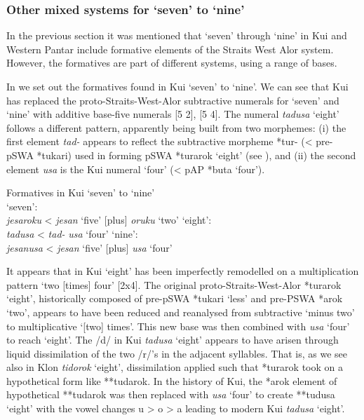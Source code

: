 \subsubsection{Other mixed systems for `seven' to `nine'}
In the previous section it was mentioned that `seven' through `nine' in Kui and Western Pantar include formative elements of the Straits West Alor system. However, the formatives are part of different systems, using a range of bases.

In  we set out the formatives found in Kui `seven' to `nine'. We can see that Kui has replaced the proto-Straits-West-Alor subtractive numerals for `seven' and `nine' with additive base-five numerals [5 2], [5 4]. The numeral \textit{tadusa} `eight' follows a different pattern, apparently being built from two morphemes: (i) the first element \textit{tad-} appears to reflect the subtractive morpheme *tur- ({\textless} pre-pSWA *tukari) used in forming pSWA *turarok `eight' (see ), and (ii) the second element \textit{usa} is the Kui numeral `four' ({\textless} pAP *buta `four'). 

 

\ea%
\label{ex:6:10}
 Formatives in Kui `seven' to `nine'\\
\ea `seven': \\
\textit{j}\textit{esaroku}  {\textless}  \textit{jesan} `five'   [plus]  \textit{oruku} `two'
\ex `eight':\\
\textit{tadusa}    {\textless}  \textit{tad-}      \textit{usa} `four'
\ex `nine':\\
\textit{je}\textit{sanusa}  {\textless}    \textit{jesan} `five'  [plus]  \textit{usa} `four'
\z
\z

It appears that in Kui `eight' has been imperfectly remodelled on a multiplication pattern `two [times] four' [2x4]. The original proto-Straits-West-Alor *turarok `eight', historically composed of pre-pSWA *tukari `less' and pre-PSWA *arok `two', appears to have been reduced and reanalysed from subtractive `minus two' to multiplicative `[two] times'. This new base was then combined with \textit{usa} `four' to reach `eight'. The /d/ in Kui \textit{tadusa} `eight' appears to have arisen through liquid dissimilation of the two /r/'s in the adjacent syllables. That is, as we see also in Klon \textit{tidorok} `eight', dissimilation applied such that *turarok took on a hypothetical form like **tudarok. In the history of Kui, the *arok element of hypothetical **tudarok was then replaced with \textit{usa} `four' to create **tudusa `eight' with the vowel changes u {\textgreater} o {\textgreater} a leading to modern Kui \textit{tadusa} `eight'.

